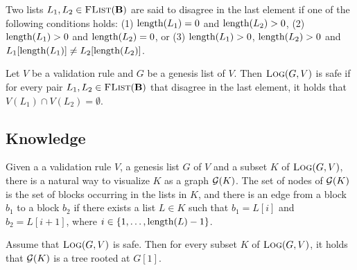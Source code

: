 %
%

Two lists $L_1, L_2 \in \text{\sc FList}(\text{\bf B})$ are said to disagree in the last element if one of the following conditions holds: (1) $\text{\rm length}(L_1) = 0$ and $\text{\rm length}(L_2) > 0$, (2) $\text{\rm length}(L_1) > 0$ and $\text{\rm length}(L_2) = 0$, or (3) $\text{\rm length}(L_1) > 0$, $\text{\rm length}(L_2) > 0$ and $L_1[\text{\rm length}(L_1)] \neq L_2[\text{\rm length}(L_2)]$.
\begin{mydef}
Let $V$ be a validation rule and $G$ be a genesis list of $V$. Then $\text{\sc Log}(G,V)$ is safe if for every pair $L_1, L_2 \in \text{\sc FList}(\text{\bf B})$ that disagree in the last element, it holds that $V(L_1) \cap V(L_2) = \emptyset$.
\end{mydef}


\subsection{Knowledge}

Given a  a validation rule $V$, a genesis list $G$ of $V$ and a subset $K$ of $\text{\sc Log}(G,V)$, there is a natural way to  visualize  $K$ as a graph $\mathcal{G}(K)$. The set of nodes of $\mathcal{G}(K)$ is the set of blocks occurring in the lists in $K$, and there is an edge from a block $b_1$ to a block $b_2$ if there exists a list $L \in K$ such that $b_1 = L[i]$ and $b_2 = L[i+1]$, where $i \in \{1, \ldots, \text{\rm length}(L) -1\}$.
\begin{mylem}
Assume that $\text{\sc Log}(G,V)$ is safe. Then for every subset $K$ of $\text{\sc Log}(G,V)$, it holds that $\mathcal{G}(K)$ is a tree rooted at $G[1]$.
\end{mylem}

\\ 

